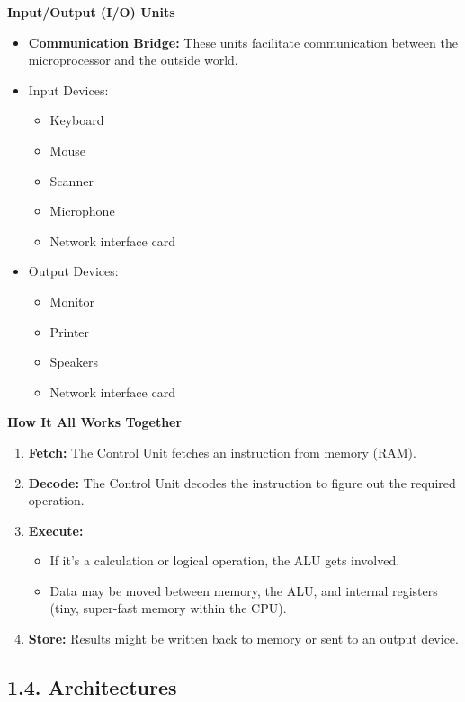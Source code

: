 \documentclass[
]{article}
\begin{document}
\textbf{Input/Output (I/O) Units}

\begin{itemize}
\item
  \textbf{Communication Bridge:} These units facilitate communication
  between the microprocessor and the outside world.
\item
  Input Devices:

  \begin{itemize}
  \item
    Keyboard
  \item
    Mouse
  \item
    Scanner
  \item
    Microphone
  \item
    Network interface card
  \end{itemize}
\item
  Output Devices:

  \begin{itemize}
  \item
    Monitor
  \item
    Printer
  \item
    Speakers
  \item
    Network interface card
  \end{itemize}
\end{itemize}

\textbf{How It All Works Together}

\begin{enumerate}
\def\labelenumi{\arabic{enumi}.}
\item
  \textbf{Fetch:} The Control Unit fetches an instruction from memory
  (RAM).
\item
  \textbf{Decode:} The Control Unit decodes the instruction to figure
  out the required operation.
\item
  \textbf{Execute:}

  \begin{itemize}
  \item
    If it's a calculation or logical operation, the ALU gets involved.
  \item
    Data may be moved between memory, the ALU, and internal registers
    (tiny, super-fast memory within the CPU).
  \end{itemize}
\item
  \textbf{Store:} Results might be written back to memory or sent to an
  output device.
\end{enumerate}

\hypertarget{14-architectures}{%
\subsection{1.4. Architectures}\label{14-architectures}}
\end{document}
